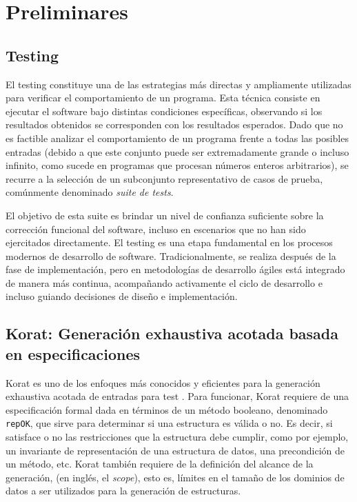 \chapter[Preliminares]{Preliminares}
\label{cap:preliminares.BE}

\section{Testing}
El testing constituye una de las estrategias más directas y ampliamente utilizadas para verificar el comportamiento de un programa.
Esta técnica consiste en ejecutar el software bajo distintas condiciones específicas, observando si los resultados obtenidos se corresponden con los resultados esperados. 
Dado que no es factible analizar el comportamiento de un programa frente a todas las posibles entradas (debido a que este conjunto puede ser extremadamente grande o incluso infinito, como sucede en programas que procesan números enteros arbitrarios), 
se recurre a la selección de un subconjunto representativo de casos de prueba, comúnmente denominado \emph{suite de tests}.

El objetivo de esta suite es brindar un nivel de confianza suficiente sobre la corrección funcional del software, 
incluso en escenarios que no han sido ejercitados directamente. 
El testing es una etapa fundamental en los procesos modernos de desarrollo de software. 
Tradicionalmente, se realiza después de la fase de implementación, pero en metodologías de desarrollo ágiles está integrado de manera más continua, 
acompañando activamente el ciclo de desarrollo e incluso guiando decisiones de diseño e implementación.



\section{Korat: Generación exhaustiva acotada basada en especificaciones}
\label{sec:korat}


Korat es uno de los enfoques más conocidos y eficientes para la generación exhaustiva acotada
de entradas para test \cite{} .
Para funcionar, Korat requiere de una especificación formal dada en términos de
un método booleano, denominado \texttt{repOK}, que sirve para determinar si una estructura
es válida o no. Es decir, si satisface o no las restricciones que la estructura
debe cumplir, como por ejemplo, un invariante de representación de una
estructura de datos, una precondición de un método, etc. Korat también requiere 
de la definición del alcance de la generación, (en inglés, el \emph{scope}),
esto es, límites en el tamaño de los dominios de datos a ser utilizados
para la generación de estructuras.

